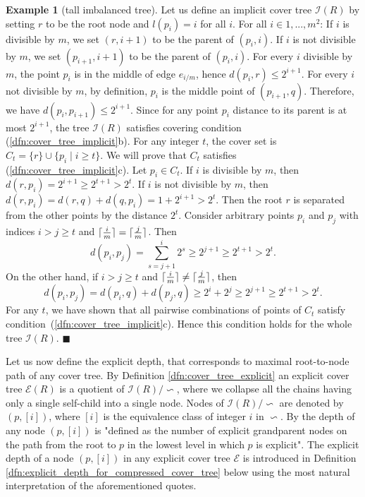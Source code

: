\documentclass{vgtc}                          %
\numberwithin{algocf}{section}
\theoremstyle{definition}
\theoremstyle{definition}
\newtheorem{exa}[algocf]{Example}
\theoremstyle{definition}
\theoremstyle{plain}
\DeclarePairedDelimiter\ceil{\lceil}{\rceil}
\newcommand{\I}{\mathcal{I}}
\newcommand{\T}{\mathcal{E}}
\newcommand{\bs}{\hfill $\blacksquare$}
\begin{document}
\begin{exa}[tall imbalanced tree]
	\medskip
	\noindent
	Let us define an implicit cover tree $\I(R)$ by setting $r$ to be the root node and $l(p_{i}) = i$ for all $i$. 
	For all $i \in 1,...,m^2$:
	If $i$ is divisible by $m$, we set  $(r,i+1)$ to be the parent of $(p_{i},i)$. 
	If $i$ is not divisible by $m$, we set $(p_{i+1},i+1)$ to be the parent of $(p_{i},i)$. 
	For every $i$ divisible by $m$, the point $p_i$ is in the middle of edge $e_{i / m}$, hence $d(p_{i}, r) \leq 2^{i + 1}$.
	For every $i$ not divisible by $m$, by definition, $p_i$ is the middle point of $(p_{i+1},q)$.
	Therefore, we have $d(p_i, p_{i+1}) \leq 2^{i+1}$. 
	Since for any point $p_i$ distance to its parent is at most $2^{i+1}$, the tree $\I(R)$ satisfies covering condition (\ref{dfn:cover_tree_implicit}b).
	For any integer $t$, the cover set is $C_t = \{r\} \cup \{ p_i \mid i \geq t\}$. 
	We will prove that $C_t$ satisfies (\ref{dfn:cover_tree_implicit}c). 
	Let $p_{i} \in C_t$.
	If $i$ is divisible by $m$, then 
	$d(r, p_i) = 2^{i+1} \geq 2^{t + 1} > 2^t.$ 
	If $i$ is not divisible by $m$, then
	$d(r, p_{i}) = d(r,q) + d(q,p_{i})  = 1 + 2^{i+1}  > 2^{t}$. 
	\medskip
    \noindent	
	Then the root $r$ is separated from the other points by the distance $2^t$. 
	Consider arbitrary points $p_{i}$ and $p_{j}$ with indices $i > j \geq t $ and $\ceil{\frac{i}{m}} = \ceil{\frac{j}{m}}$.
	Then
	$$d(p_{i}, p_{j}) = \sum^{i}_{s = j+1} 2^{s}  \geq 2^{j+1} \geq 2^{t+1} > 2^{t}.$$
	On the other hand, if $i > j \geq t $ and $\ceil{\frac{i}{m}} \neq \ceil{\frac{j}{m}}$, then
	$$d(p_{i} , p_{j}) = d(p_{i},q) + d(p_{j} ,q)  \geq  2^{i} + 2^{j} \geq 2^{j+1} \geq 2^{t+1} > 2^t.$$
	For any $t$, we have shown that all pairwise combinations of points of $C_{t}$ satisfy condition~(\ref{dfn:cover_tree_implicit}c).
	Hence this condition holds for the whole tree $\I(R)$.
	\bs
\end{exa}



\noindent
Let us now define the explicit depth, that corresponds to maximal root-to-node path of any cover tree. 
By Definition \ref{dfn:cover_tree_explicit} an explicit cover tree $\T(R)$ is a quotient of $\I(R) / \backsim$, where we collapse all the chains having only a single self-child into a single node. 
Nodes of $\I(R) / \backsim$ are denoted by $(p,[i])$, where $[i]$ is the equivalence class of integer $i$ in $\backsim$. 
By  \cite[Lemma~4.3]{beygelzimer2006cover} the depth of any node $(p,[i])$ is "defined as the number of explicit grandparent nodes on the path from the root to $p$ in the lowest level in which $p$ is explicit". The explicit depth of a node $(p,[i])$ in any explicit cover tree $\T$ is introduced in Definition \ref{dfn:explicit_depth_for_compressed_cover_tree} below using the most natural interpretation of the aforementioned quotes. 
\end{document}
